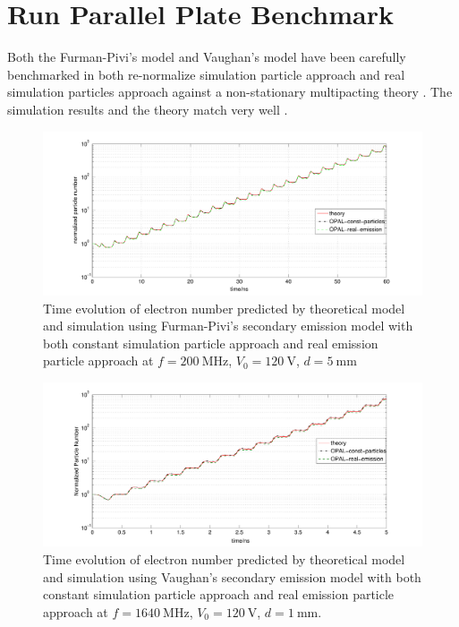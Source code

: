 \section{Run Parallel Plate Benchmark}
\label{sec:RunPP}
Both the Furman-Pivi's model and Vaughan's model have been carefully benchmarked in both re-normalize simulation particle approach and real simulation particles approach against a non-stationary multipacting theory \cite{nonstationary}. The \opal simulation results and the theory match very well .
\begin{figure}[ht]
 \begin{center}
 \includegraphics[width=1\linewidth,angle=0]{figures/Multipacting/const_particle_benchmark_FurmanPivi.pdf}
  \caption{Time evolution of electron number predicted by theoretical model and \opal simulation using Furman-Pivi's secondary emission model with both constant simulation particle approach and real emission particle approach at $f=\SI{200}{\mega\hertz}$, $V_0=\SI{120}{\volt}$, $d=\SI{5}{\milli\meter}$}
  \label{fig:PPFurman-Pivi}
 \end{center}
\end{figure}
\begin{figure}[ht]
 \begin{center}
 \includegraphics[width=1\linewidth,angle=0]{figures/Multipacting/const_particle_benchmark.pdf}
  \caption{Time evolution of electron number predicted by theoretical model and \opal simulation using Vaughan's secondary emission model with both constant simulation particle approach and real emission particle approach at $f=\SI{1640}{\mega\hertz}$, $V_0=\SI{120}{\volt}$, $d=\SI{1}{\milli\meter}$.}
  \label{fig:PPVaughan}
 \end{center}
\end{figure}

